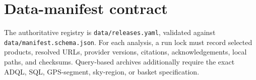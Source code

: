 \section{Data-manifest contract}
The authoritative registry is \texttt{data/releases.yaml}, validated against \texttt{data/manifest.schema.json}. For each analysis, a run lock must record selected products, resolved URLs, provider versions, citations, acknowledgements, local paths, and checksums. Query-based archives additionally require the exact ADQL, SQL, GPS-segment, sky-region, or basket specification.